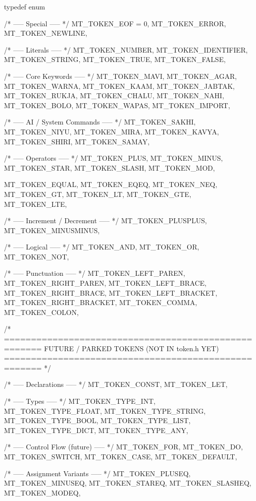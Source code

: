 \documentclass{article}
\begin{document}
typedef enum {

    /* ----- Special ----- */
    MT_TOKEN_EOF = 0,
    MT_TOKEN_ERROR,
    MT_TOKEN_NEWLINE,

    /* ----- Literals ----- */
    MT_TOKEN_NUMBER,
    MT_TOKEN_IDENTIFIER,
    MT_TOKEN_STRING,
    MT_TOKEN_TRUE,
    MT_TOKEN_FALSE,

    /* ----- Core Keywords ----- */
    MT_TOKEN_MAVI,
    MT_TOKEN_AGAR,
    MT_TOKEN_WARNA,
    MT_TOKEN_KAAM,
    MT_TOKEN_JABTAK,
    MT_TOKEN_RUKJA,
    MT_TOKEN_CHALU,
    MT_TOKEN_NAHI,
    MT_TOKEN_BOLO,
    MT_TOKEN_WAPAS,
    MT_TOKEN_IMPORT,

    /* ----- AI / System Commands ----- */
    MT_TOKEN_SAKHI,
    MT_TOKEN_NIYU,
    MT_TOKEN_MIRA,
    MT_TOKEN_KAVYA,
    MT_TOKEN_SHIRI,
    MT_TOKEN_SAMAY,

    /* ----- Operators ----- */
    MT_TOKEN_PLUS,
    MT_TOKEN_MINUS,
    MT_TOKEN_STAR,
    MT_TOKEN_SLASH,
    MT_TOKEN_MOD,

    MT_TOKEN_EQUAL,
    MT_TOKEN_EQEQ,
    MT_TOKEN_NEQ,
    MT_TOKEN_GT,
    MT_TOKEN_LT,
    MT_TOKEN_GTE,
    MT_TOKEN_LTE,

    /* ----- Increment / Decrement ----- */
    MT_TOKEN_PLUSPLUS,
    MT_TOKEN_MINUSMINUS,

    /* ----- Logical ----- */
    MT_TOKEN_AND,
    MT_TOKEN_OR,
    MT_TOKEN_NOT,

    /* ----- Punctuation ----- */
    MT_TOKEN_LEFT_PAREN,
    MT_TOKEN_RIGHT_PAREN,
    MT_TOKEN_LEFT_BRACE,
    MT_TOKEN_RIGHT_BRACE,
    MT_TOKEN_LEFT_BRACKET,
    MT_TOKEN_RIGHT_BRACKET,
    MT_TOKEN_COMMA,
    MT_TOKEN_COLON,

/* =====================================================
   FUTURE / PARKED TOKENS (NOT IN token.h YET)
   ===================================================== */

    /* ----- Declarations ----- */
    MT_TOKEN_CONST,
    MT_TOKEN_LET,

    /* ----- Types ----- */
    MT_TOKEN_TYPE_INT,
    MT_TOKEN_TYPE_FLOAT,
    MT_TOKEN_TYPE_STRING,
    MT_TOKEN_TYPE_BOOL,
    MT_TOKEN_TYPE_LIST,
    MT_TOKEN_TYPE_DICT,
    MT_TOKEN_TYPE_ANY,

    /* ----- Control Flow (future) ----- */
    MT_TOKEN_FOR,
    MT_TOKEN_DO,
    MT_TOKEN_SWITCH,
    MT_TOKEN_CASE,
    MT_TOKEN_DEFAULT,

    /* ----- Assignment Variants ----- */
    MT_TOKEN_PLUSEQ,
    MT_TOKEN_MINUSEQ,
    MT_TOKEN_STAREQ,
    MT_TOKEN_SLASHEQ,
    MT_TOKEN_MODEQ,

}
\end{document}
